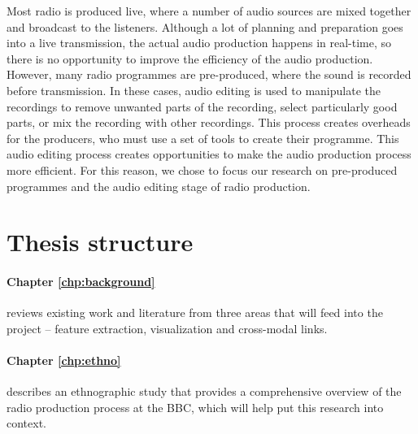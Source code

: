 

Most radio is produced live, where a number of audio sources are mixed together and broadcast to the listeners.
Although a lot of planning and preparation goes into a live transmission, the actual audio production happens in
real-time, so there is no opportunity to improve the efficiency of the audio production. However, many radio programmes
are pre-produced, where the sound is recorded before transmission.  In these cases, audio editing is used to manipulate
the recordings to remove unwanted parts of the recording, select particularly good parts, or mix the recording with
other recordings. This process creates overheads for the producers, who must use a set of tools to create their
programme. This audio editing process creates opportunities to make the audio production process more efficient. For
this reason, we chose to focus our research on pre-produced programmes and the audio editing stage of radio production.


\section{Thesis structure}\label{sec:intro/structure}

\paragraph{Chapter \ref{chp:background}} reviews existing work and literature from three areas that will feed into the
project -- feature extraction, visualization and cross-modal links.

\paragraph{Chapter \ref{chp:ethno}} describes an ethnographic study that provides a comprehensive overview of the radio
production process at the BBC, which will help put this research into context.

